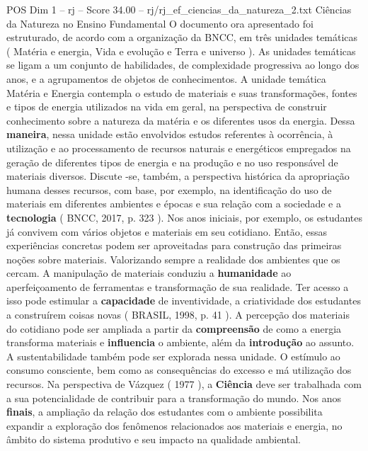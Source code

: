 \begin{textsample}{POS Dim 1 – rj – Score 34.00 – rj/rj\_ef\_ciencias\_da\_natureza\_2.txt}  \label{ex:f1_pos_275}
Ciências da Natureza no Ensino Fundamental O documento ora apresentado foi estruturado, de acordo com a organização da BNCC, em três unidades temáticas ( Matéria e energia, Vida e evolução e Terra e universo ).
As unidades temáticas se ligam a um conjunto de habilidades, de complexidade progressiva ao longo dos anos, e a agrupamentos de objetos de conhecimentos.
A unidade temática Matéria e Energia contempla o estudo de materiais e suas transformações, fontes e tipos de energia utilizados na vida em geral, na perspectiva de construir conhecimento sobre a natureza da matéria e os diferentes usos da energia.
Dessa \textbf{maneira}, nessa unidade estão envolvidos estudos referentes à ocorrência, à utilização e ao processamento de recursos naturais e energéticos empregados na geração de diferentes tipos de energia e na produção e no uso responsável de materiais diversos.
Discute -se, também, a perspectiva histórica da apropriação humana desses recursos, com base, por exemplo, na identificação do uso de materiais em diferentes ambientes e épocas e sua relação com a sociedade e a \textbf{tecnologia} ( BNCC, 2017, p. 323 ).
Nos anos iniciais, por exemplo, os estudantes já convivem com vários objetos e materiais em seu cotidiano.
Então, essas experiências concretas podem ser aproveitadas para construção das primeiras noções sobre materiais.
Valorizando sempre a realidade dos ambientes que os cercam.
A manipulação de materiais conduziu a \textbf{humanidade} ao aperfeiçoamento de ferramentas e transformação de sua realidade.
Ter acesso a isso pode estimular a \textbf{capacidade} de inventividade, a criatividade dos estudantes a construírem coisas novas ( BRASIL, 1998, p. 41 ).
A percepção dos materiais do cotidiano pode ser ampliada a partir da \textbf{compreensão} de como a energia transforma materiais e \textbf{influencia} o ambiente, além da \textbf{introdução} ao assunto.
A sustentabilidade também pode ser explorada nessa unidade.
O estímulo ao consumo consciente, bem como as consequências do excesso e má utilização dos recursos.
Na perspectiva de Vázquez ( 1977 ), a \textbf{Ciência} deve ser trabalhada com a sua potencialidade de contribuir para a transformação do mundo.
Nos anos \textbf{finais}, a ampliação da relação dos estudantes com o ambiente possibilita expandir a exploração dos fenômenos relacionados aos materiais e energia, no âmbito do sistema produtivo e seu impacto na qualidade ambiental.

\end{textsample}
